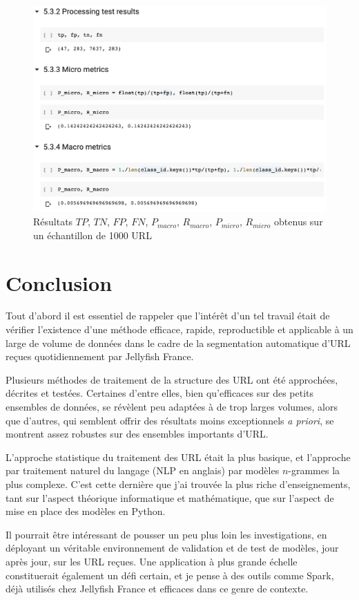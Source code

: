 \documentclass[11pt, a4paper]{article}
\begin{document}
\begin{figure}[!h]
	\center
	\includegraphics[scale=0.29]{results.png}
	\caption{Résultats $TP$, $TN$, $FP$, $FN$, $P_{macro}$, $R_{macro}$, $P_{micro}$, $R_{micro}$ obtenus sur un échantillon de 1000 URL}
	\label{results}
\end{figure}

\section{Conclusion}

Tout d'abord il est essentiel de rappeler que l'intérêt d'un tel travail était de vérifier l'existence d'une méthode efficace, rapide, reproductible et applicable à un large de volume de données dans le cadre de la segmentation automatique d'URL reçues quotidiennement par Jellyfish France.

Plusieurs méthodes de traitement de la structure des URL ont été approchées, décrites et testées. Certaines d'entre elles, bien qu'efficaces sur des petits ensembles de données, se révèlent peu adaptées à de trop larges volumes, alors que d'autres, qui semblent offrir des résultats moins exceptionnels \textit{a priori}, se montrent assez robustes sur des ensembles importants d'URL.

L'approche statistique du traitement des URL était la plus basique, et l'approche par traitement naturel du langage (NLP en anglais) par modèles $n$-grammes la plus complexe. C'est cette dernière que j'ai trouvée la plus riche d'enseignements, tant sur l'aspect théorique informatique et mathématique, que sur l'aspect de mise en place des modèles en Python. 

Il pourrait être intéressant de pousser un peu plus loin les investigations, en déployant un véritable environnement de validation et de test de modèles, jour après jour, sur les URL reçues. Une application à plus grande échelle constituerait également un défi certain, et je pense à des outils comme Spark, déjà utilisés chez Jellyfish France et efficaces dans ce genre de contexte.

\newpage
{}


\end{document}
